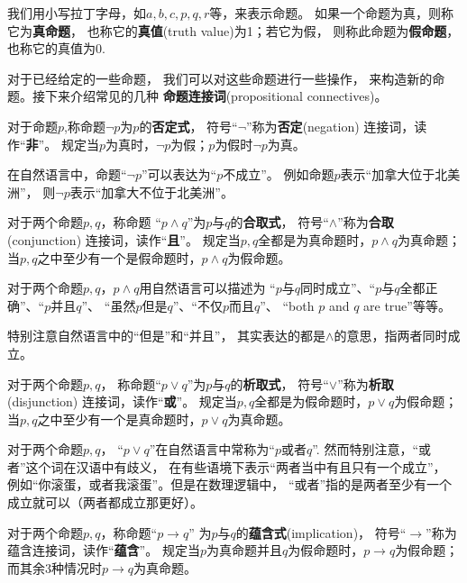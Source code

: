 我们用小写拉丁字母，如$a,b,c,p,q,r$等，来表示命题。
如果一个命题为真，则称它为\textbf{真命题}，
也称它的\textbf{真值}(truth value)为1；若它为假，
则称此命题为\textbf{假命题}，也称它的真值为0.
\vsp

对于已经给定的一些命题，
我们可以对这些命题进行一些操作，
来构造新的命题。接下来介绍常见的几种
\textbf{命题连接词}(propositional connectives)。

\begin{definition}[否定连接词]
对于命题$p$,称命题$\neg p$为$p$的\textbf{否定式}，
符号“$\neg$”称为\textbf{否定}(negation)
连接词，读作“\textbf{非}”。
规定当$p$为真时，$\neg p$为假；$p$为假时$\neg p$为真。
\end{definition}

在自然语言中，命题“$\neg p$”可以表达为“$p$不成立”。
例如命题$p$表示“加拿大位于北美洲”，
则$\neg p$表示“加拿大不位于北美洲”。

\begin{definition}[合取连接词]
对于两个命题$p,q$，称命题
“$p\wedge q$”为$p$与$q$的\textbf{合取式}，
符号“$\wedge$”称为\textbf{合取}(conjunction)
连接词，读作“\textbf{且}”。
规定当$p,q$全都是为真命题时，$p\wedge q$为真命题；
当$p,q$之中至少有一个是假命题时，$p\wedge q$为假命题。
\end{definition}
对于两个命题$p,q$，$p\wedge q$用自然语言可以描述为
“$p$与$q$同时成立”、“$p$与$q$全都正确”、“$p$并且$q$”、
“虽然$p$但是$q$”、“不仅$p$而且$q$”、
“both $p$ and $q$ are true”等等。

特别注意自然语言中的“但是”和“并且”，
其实表达的都是$\wedge$的意思，指两者同时成立。

\begin{definition}[析取连接词]
对于两个命题$p,q$，
称命题“$p\vee q$”为$p$与$q$的\textbf{析取式}，
符号“$\vee$”称为\textbf{析取}(disjunction)
连接词，读作“\textbf{或}”。
规定当$p,q$全都是为假命题时，$p\vee q$为假命题；
当$p,q$之中至少有一个是真命题时，$p\vee q$为真命题。
\end{definition}
对于两个命题$p,q$，
“$p\vee q$”在自然语言中常称为“$p$或者$q$”.
然而特别注意，“或者”这个词在汉语中有歧义，
在有些语境下表示“两者当中有且只有一个成立”，
例如“你滚蛋，或者我滚蛋”。但是在数理逻辑中，
“或者”指的是两者至少有一个成立就可以（两者都成立那更好）。

\begin{definition}[蕴含连接词]
对于两个命题$p,q$，称命题“$p\rightarrow q$”
为$p$与$q$的\textbf{蕴含式}(implication)，
符号“$\rightarrow$”称为蕴含连接词，读作“\textbf{蕴含}”。
规定当$p$为真命题并且$q$为假命题时，$p\rightarrow q$为假命题；
而其余3种情况时$p\rightarrow q$为真命题。
\end{definition}


